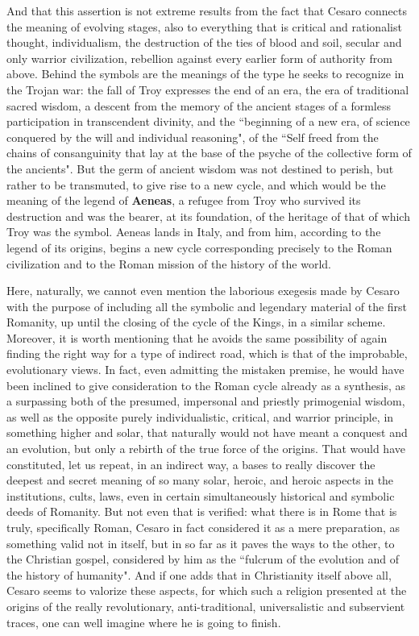 And that this assertion is not extreme results from the fact that Cesaro connects the meaning of evolving stages, also to everything that is critical and rationalist thought, individualism, the destruction of the ties of blood and soil, secular and only warrior civilization, rebellion against every earlier form of authority from above. Behind the symbols are the meanings of the type he seeks to recognize in the Trojan war: the fall of Troy expresses the end of an era, the era of traditional sacred wisdom, a descent from the memory of the ancient stages of a formless participation in transcendent divinity, and the ``beginning of a new era, of science conquered by the will and individual reasoning", of the ``Self freed from the chains of consanguinity that lay at the base of the psyche of the collective form of the ancients". But the germ of ancient wisdom was not destined to perish, but rather to be transmuted, to give rise to a new cycle, and which would be the meaning of the legend of \textbf{Aeneas}, a refugee from Troy who survived its destruction and was the bearer, at its foundation, of the heritage of that of which Troy was the symbol. Aeneas lands in Italy, and from him, according to the legend of its origins, begins a new cycle corresponding precisely to the Roman civilization and to the Roman mission of the history of the world.

Here, naturally, we cannot even mention the laborious exegesis made by Cesaro with the purpose of including all the symbolic and legendary material of the first Romanity, up until the closing of the cycle of the Kings, in a similar scheme. Moreover, it is worth mentioning that he avoids the same possibility of again finding the right way for a type of indirect road, which is that of the improbable, evolutionary views. In fact, even admitting the mistaken premise, he would have been inclined to give consideration to the Roman cycle already as a synthesis, as a surpassing both of the presumed, impersonal and priestly primogenial wisdom, as well as the opposite purely individualistic, critical, and warrior principle, in something higher and solar, that naturally would not have meant a conquest and an evolution, but only a rebirth of the true force of the origins. That would have constituted, let us repeat, in an indirect way, a bases to really discover the deepest and secret meaning of so many solar, heroic, and heroic aspects in the institutions, cults, laws, even in certain simultaneously historical and symbolic deeds of Romanity. But not even that is verified: what there is in Rome that is truly, specifically Roman, Cesaro in fact considered it as a mere preparation, as something valid not in itself, but in so far as it paves the ways to the other, to the Christian gospel, considered by him as the ``fulcrum of the evolution and of the history of humanity". And if one adds that in Christianity itself above all, Cesaro seems to valorize these aspects, for which such a religion presented at the origins of the really revolutionary, anti-traditional, universalistic and subservient traces, one can well imagine where he is going to finish.


